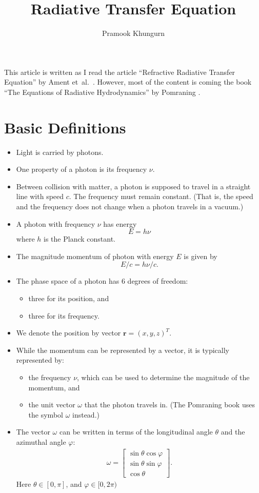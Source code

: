 \documentclass[10pt]{article}
\title{Radiative Transfer Equation}
\author{Pramook Khungurn}
\newcommand{\ve}[1]{\mathbf{#1}}
\newcommand{\etal}{{et~al.}}
\begin{document}
  \maketitle

  This article is written as I read the article ``Refractive Radiative Transfer Equation'' by Ament \etal\ \cite{Ament:2014}. However, most of the content is coming the book ``The Equations of Radiative Hydrodynamics'' by Pomraning \cite{pomraning}.

  \section{Basic Definitions}
  \begin{itemize}
    \item Light is carried by photons. 
    \item One property of a photon is its frequency $\nu$.
    \item Between collision with matter, a photon is supposed to travel in a straight line with speed $c$. The frequency must remain constant. (That is, the speed and the frequency does not change when a photon travels in a vacuum.)
    \item A photon with frequency $\nu$ has energy $$E = h\nu$$ where $h$ is the Planck constant.
    \item The magnitude momentum of photon with energy $E$ is given by $$ E/c = h\nu/c. $$
    \item The phase space of a photon has 6 degrees of freedom:
    \begin{itemize}
      \item three for its position, and
      \item three for its frequency.
    \end{itemize}
    \item We denote the position by vector $\ve{r} = (x,y,z)^T$.
    \item While the momentum can be represented by a vector, it is typically represented by:
    \begin{itemize}
      \item the frequency $\nu$, which can be used to determine the magnitude of the momentum, and
      \item the unit vector $\omega$ that the photon travels in. (The Pomraning book uses the symbol $\omega$ instead.)
    \end{itemize}
    
    \item The vector $\omega$ can be written in terms of the longitudinal angle $\theta$ and the azimuthal angle $\varphi$:
    \begin{align*}
      \omega = \begin{bmatrix}
        \sin \theta \cos \varphi \\
        \sin \theta \sin \varphi \\
        \cos \theta
      \end{bmatrix}.
    \end{align*}
    Here $\theta \in [0,\pi]$, and $\varphi \in [0,2\pi)$


\end{itemize}
\end{document}
